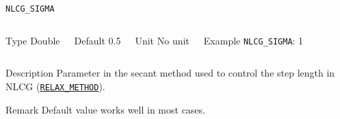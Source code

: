 \documentclass[xcolor=dvipsnames,t]{beamer}
\begin{document}
\begin{frame}[allowframebreaks]{\texttt{NLCG\_SIGMA}} \label{NLCG_SIGMA}
\vspace*{-12pt}
\begin{columns}
\begin{block}{Type}
Double
\end{block}

\begin{block}{Default}
0.5
\end{block}

\begin{block}{Unit}
No unit
\end{block}

\begin{block}{Example}
\texttt{NLCG\_SIGMA}: 1
\end{block}
\end{columns}

\begin{block}{Description}
Parameter in the secant method used to control the step length in NLCG (\hyperlink{RELAX_METHOD}{\texttt{RELAX\_METHOD}}). 
\end{block}

\begin{block}{Remark}
Default value works well in most cases.
\end{block}

\end{frame}
\end{document}
